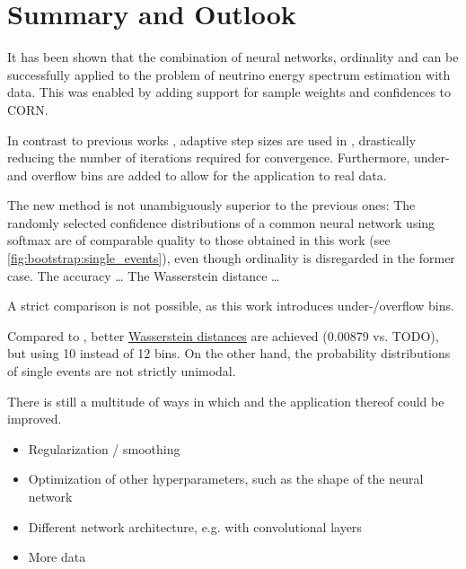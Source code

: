 \chapter{Summary and Outlook} \label{sec:summary}

It has been shown that
the combination of neural networks, ordinality and \dsea{}
  can be successfully applied to
  the problem of neutrino energy spectrum estimation
  with \icecube{} data.
This was enabled by
  adding support for
    sample weights
    and confidences
  to \ac{CORN}.

In contrast to previous works \cite{dsea_jan, dsea_samuel},
  adaptive step sizes \cite{dsea_mirko} are used in \dsea{},
    drastically reducing the number of iterations required for convergence.
Furthermore,
  under- and overflow bins are added
    to allow for the application to real data.

The new method is not unambiguously superior to the previous ones:
  The randomly selected confidence distributions of a common neural network using softmax \cite{dsea_samuel}
    are of comparable quality to those obtained in this work (see \autoref{fig:bootstrap:single_events}),
      even though ordinality is disregarded in the former case.
%
The accuracy …
The Wasserstein distance …

A strict comparison is not possible,
  as this work introduces under-/overflow bins.

Compared to \cite{dsea_jan},
  better \hyperref[sec:unfolding:metrics:wd]{Wasserstein distances} are achieved
    (\num{0.00879} vs. TODO),
    but using \num{10} instead of \num{12} bins.
On the other hand,
the probability distributions of single events are not strictly unimodal.


There is still a multitude of ways in which \dsea{} and the application thereof could be improved.
\begin{itemize}
  \item Regularization / smoothing
  \item Optimization of other hyperparameters, such as the shape of the neural network
  \item Different network architecture, e.g. with convolutional layers
  \item More data
\end{itemize}

